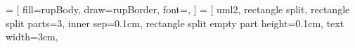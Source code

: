 \usepackage[T1]{fontenc} %
\usepackage{color}
\usepackage{setspace}
\usepackage[top=1cm, bottom=1cm, left=1cm, right=1cm]{geometry}
\usepackage{fancyhdr}
    \pagestyle{empty}
\usepackage[rgb]{xcolor}
\usepackage{tikz}
    \usetikzlibrary{shapes} %
    \usetikzlibrary{chains} %
    \usetikzlibrary{arrows} %
    \usetikzlibrary{decorations.pathmorphing}
    \usetikzlibrary{positioning}
    \usetikzlibrary{fit}
    \usetikzlibrary{trees} %
     = [
        fill=rupBody,
        draw=rupBorder,
        font={\ttfamily},
    ]
     = [ %
        uml2,
        rectangle split,
        rectangle split parts=3,
        inner sep=0.1cm,
        rectangle split empty part height=0.1cm,
        text width=3cm,
